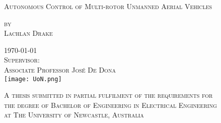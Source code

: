 ﻿%


\begin{titlepage}
\begin{center}
\pagenumbering{}

{\LARGE\textsc{Autonomous Control of Multi-rotor Unmanned Aerial Vehicles}\\}

\vspace{1cm}

\Large
\textsc{
by\\[0.5\baselineskip]
Lachlan Drake\\}

\vspace{1cm}
\textsc{\today}\\ %

\vspace{1cm}
\textsc{Supervisor:\\
Associate Professor José De Dona}\\

\vspace{1cm}
\texttt{[image: UoN.png]}

\vspace{2cm}
\small\textsc{A thesis submitted in partial fulfilment of the requirements for\\ the degree of Bachelor of Engineering in Electrical Engineering\\ at The University of Newcastle, Australia}

\clearpage
\end{center}

\end{titlepage}

